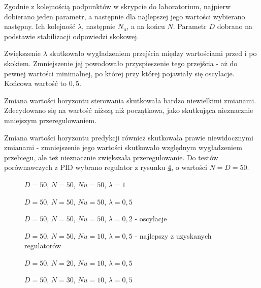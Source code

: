 Zgodnie z kolejnością podpunktów w skrypcie do laboratorium, najpierw dobierano jeden parametr, a następnie dla najlepszej jego wartości wybierano następny. Ich kolejność $ \lambda $, następnie $ N_\mathrm{u} $, a na końcu $ N $. Parametr $ D $ dobrano na podstawie stabilizacji odpowiedzi skokowej.

Zwiększenie $ \lambda $ skutkowało wygładzeniem przejścia między wartościami przed i po skokiem. Zmniejszenie jej powodowało przyspieszenie tego przejścia - aż do pewnej wartości minimalnej, po której przy której pojawiały się oscylacje. Końcowa wartość to $ 0,5 $.

Zmiana wartości horyzontu sterowania skutkowała bardzo niewielkimi zmianami. Zdecydowano się na wartość niższą niż początkowa, jako skutkująca nieznacznie mniejszym przeregulowaniem.

Zmiana wartości horyzontu predykcji również skutkowała prawie niewidocznymi zmianami - zmniejszenie jego wartości skutkowało względnym wygładzeniem przebiegu, ale też nieznacznie zwiększała przeregulowanie. Do testów porównawczych z PID wybrano regulator z rysunku \ref{DMC6}, o wartości $ N = D = 50 $.

\begin{figure}[H]
\centering

\caption{$ D = 50 $, $  N = 50 $, $ Nu = 50 $, $ \lambda = 1 $}
\label{DMC3}
\end{figure}

\begin{figure}[H]
\centering

\caption{$ D = 50 $, $  N = 50 $, $ Nu = 50 $, $ \lambda = 0,5 $}
\label{DMC4}
\end{figure}

\begin{figure}[H]
\centering

\caption{$ D = 50 $, $  N = 50 $, $ Nu = 50 $, $ \lambda = 0,2 $ - oscylacje}
\label{DMC5}
\end{figure}

\begin{figure}[H]
\centering

\caption{$ D = 50 $, $  N = 50 $, $ Nu = 10 $, $ \lambda = 0,5 $ - najlepszy z uzyskanych regulatorów}
\label{DMC6}
\end{figure}

\begin{figure}[H]
\centering

\caption{$ D = 50 $, $  N = 20 $, $ Nu = 10 $, $ \lambda = 0,5 $}
\label{DMC7}
\end{figure}

\begin{figure}[H]
\centering

\caption{$ D = 50 $, $  N = 30 $, $ Nu = 10 $, $ \lambda = 0,5 $}
\label{DMC8}
\end{figure}

